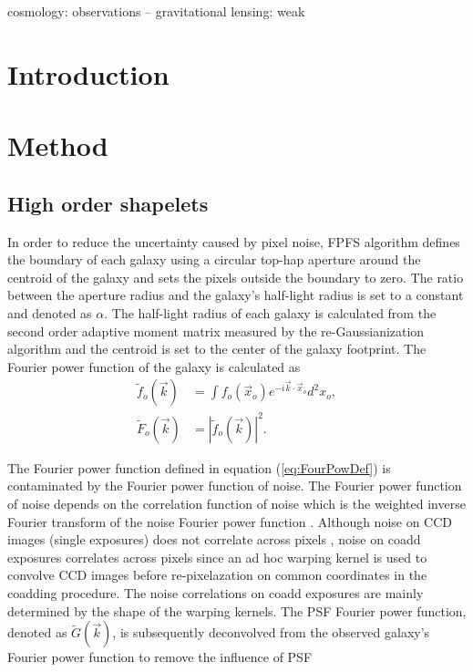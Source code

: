 \documentclass[a4paper,fleqn,usenatbib]{mnras}
\title[FPFS2: Second generation of Fourier Power Function Shapelets}
\author[]{}
\begin{document}
\label{firstpage}
\pagerange{\pageref{firstpage}--\pageref{lastpage}}
\maketitle

\begin{abstract}
\end{abstract}


\begin{keywords}
cosmology: observations -- gravitational lensing: weak
\end{keywords}

\section{Introduction}
\label{sec:Intro}


\section{Method}
\label{sec:Method}

\subsection{High order shapelets}
\label{sec:Method-shapelets}

In order to reduce the uncertainty caused by pixel noise, FPFS algorithm
defines the boundary of each galaxy using a circular top-hap aperture around
the centroid of the galaxy \citep{Li17Auto} and sets the pixels outside the
boundary to zero. The ratio between the aperture radius and the galaxy's
half-light radius is set to a constant and denoted as $\alpha$. The half-light
radius of each galaxy is calculated from the second order adaptive moment
matrix measured by the re-Gaussianization algorithm \citep{reGaussianization}
and the centroid is set to the center of the galaxy footprint. The Fourier
power function of the galaxy is calculated as
\begin{equation} \label{eq:FourPowDef}
\begin{split}
\tilde{f}_o(\vec{k})&=\int f_o(\vec{x}_o) e^{-i\vec{k} \cdot \vec{x}_o} d^2x_o,\\
\tilde{F}_o(\vec{k})&=|\tilde{f}_o(\vec{k})|^2.
\end{split}
\end{equation}


The Fourier power function defined in equation (\ref{eq:FourPowDef}) is
contaminated by the Fourier power function of noise. The Fourier power function
of noise depends on the correlation function of noise which is the weighted
inverse Fourier transform of the noise Fourier power function \citep{Li18FPFS}.
Although noise on CCD images (single exposures) does not correlate across
pixels \citep{Z15}, noise on coadd exposures correlates across pixels since an
ad hoc warping kernel is used to convolve CCD images before re-pixelazation on
common coordinates in the coadding procedure. The noise correlations on coadd
exposures are mainly determined by the shape of the warping kernels.
The PSF Fourier power function, denoted as $\tilde{G}(\vec{k})$, is
subsequently deconvolved from the observed galaxy's Fourier power function to
remove the influence of PSF
\end{document}
